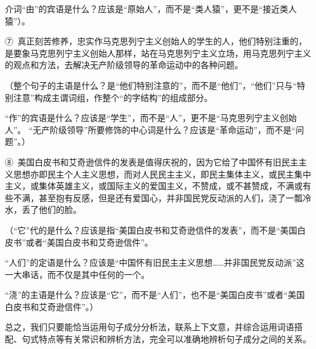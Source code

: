 介词“由”的宾语是什么？应该是“原始人”，而不是“类人猿”，更不是“接近类人猿”）。

⑦\ 真正刻苦修养，忠实作马克思列宁主义创始人的学生的人，他们特别注重的，是要象马克思列宁主义创始人那样，站在马克思列宁主义立场，用马克思列宁主义的观点和方法，去解决无产阶级领导的革命运动中的各种问题。

（整个句子的主语是什么？是“他们特别注意的”，而不是“他们”，“他们”只与“特别注意”构成主谓词组，作整个“的字结构”的组成部分。

“作”的宾语是什么？应该是“学生”，而不是“人”，更不是“马克思列宁主义创始人”。 “无产阶级领导”所要修饰的中心词是什么？应该是“革命运动”，而不是“问题”。）

⑧\ 美国白皮书和艾奇逊信件的发表是值得庆祝的，因为它给了中国怀有旧民主主义思想亦即民主个人主义思想，而对人民民主主义，即民主集体主义，或民主集中主义，或集体英雄主义，或国际主义的爱国主义，不赞成，或不甚赞成，不满或有些不满，甚至抱有反感，但是还有爱国心，并非国民党反动派的人们，浇了一瓢冷水，丢了他们的脸。

（“它”代的是什么？应该是指“美国白皮书和艾奇逊信件的发表”，而不是“美国白皮书”或者“美国白皮书和艾奇逊信件”。

“人们”的定语是什么？应该是“中国怀有旧民主主义思想……并非国民党反动派”这一大串话，而不仅是其中任何的一个。

“浇”的主语是什么？应该是“它”，而不是“人们”，也不是“美国白皮书”或者“美国白皮书和艾奇逊信件”。）

总之，我们只要能恰当运用句子成分分析法，联系上下文意，并综合运用词语搭配、句式特点等有关常识和辨析方法，完全可以准确地辨析句子成分之间的关系。
\newpage